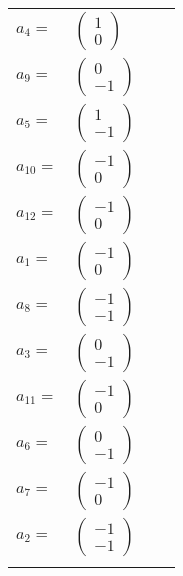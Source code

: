 \documentclass[1p]{elsarticle_modified}
\theoremstyle{definition}
\begin{document}
\begin{tabular}{m{7pt} m{180pt} m{7pt} m{180pt} }
\flushright $a_{4}=$&$\begin{pmatrix}1\\0\end{pmatrix}$ \\
\flushright $a_{9}=$&$\begin{pmatrix}0\\-1\end{pmatrix}$ \\
\flushright $a_{5}=$&$\begin{pmatrix}1\\-1\end{pmatrix}$ \\
\flushright $a_{10}=$&$\begin{pmatrix}-1\\0\end{pmatrix}$ \\
\flushright $a_{12}=$&$\begin{pmatrix}-1\\0\end{pmatrix}$ \\
\flushright $a_{1}=$&$\begin{pmatrix}-1\\0\end{pmatrix}$ \\
\flushright $a_{8}=$&$\begin{pmatrix}-1\\-1\end{pmatrix}$ \\
\flushright $a_{3}=$&$\begin{pmatrix}0\\-1\end{pmatrix}$ \\
\flushright $a_{11}=$&$\begin{pmatrix}-1\\0\end{pmatrix}$ \\
\flushright $a_{6}=$&$\begin{pmatrix}0\\-1\end{pmatrix}$ \\
\flushright $a_{7}=$&$\begin{pmatrix}-1\\0\end{pmatrix}$ \\
\flushright $a_{2}=$&$\begin{pmatrix}-1\\-1\end{pmatrix}$\\&\end{tabular}
\end{document}
